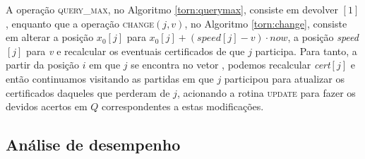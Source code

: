 



A operação \textsc{query\_max}, no Algoritmo \ref{torn:querymax},
consiste em devolver \torneio$[1]$, enquanto que a operação
\textsc{change}$(j, v)$, no Algoritmo \ref{torn:change}, consiste em
alterar a posição $x_0[j]$ para ${x_0[j] + (\mathit{speed}[j] -
v)\cdot now}$, a posição \textit{speed}$[j]$ para \textit{v} e
recalcular os eventuais certificados de que $j$ participa. Para
tanto, a partir da posição $i$ em que $j$ se encontra no vetor
\torneio, podemos recalcular \textit{cert}$[j]$ e então continuamos
visitando as partidas em que $j$ participou para atualizar os
certificados daqueles que perderam de $j$, acionando a rotina
\textsc{update} para fazer os devidos acertos em $Q$ correspondentes
a estas modificações.









\FloatBarrier
\subsection{Análise de desempenho}



